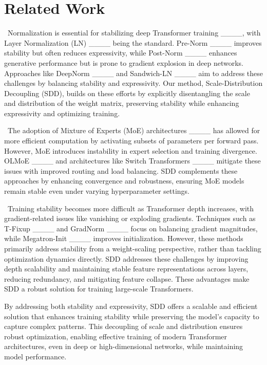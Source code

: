 \section{Related Work}
\label{sec:related work}
\textbf{}\
Normalization is essential for stabilizing deep Transformer training ____, with Layer Normalization (LN) ____ being the standard. Pre-Norm ____ improves stability but often reduces expressivity, while Post-Norm ____ enhances generative performance but is prone to gradient explosion in deep networks. Approaches like DeepNorm ____ and Sandwich-LN ____ aim to address these challenges by balancing stability and expressivity. Our method, Scale-Distribution Decoupling (SDD), builds on these efforts by explicitly disentangling the scale and distribution of the weight matrix, preserving stability while enhancing expressivity and optimizing training.

\textbf{}\
The adoption of Mixture of Experts (MoE) architectures ____ has allowed for more efficient computation by activating subsets of parameters per forward pass. However, MoE introduces instability in expert selection and training divergence. OLMoE ____ and architectures like Switch Transformers ____ mitigate these issues with improved routing and load balancing. SDD complements these approaches by enhancing convergence and robustness, ensuring MoE models remain stable even under varying hyperparameter settings.

\textbf{\noindent{Scaling and Stability in Large Language Models.}}\
Training stability becomes more difficult as Transformer depth increases, with gradient-related issues like vanishing or exploding gradients. Techniques such as T-Fixup ____ and GradNorm ____ focus on balancing gradient magnitudes, while Megatron-Init ____ improves initialization. However, these methods primarily address stability from a weight-scaling perspective, rather than tackling optimization dynamics directly. SDD addresses these challenges by improving depth scalability and maintaining stable feature representations across layers, reducing redundancy, and mitigating feature collapse. These advantages make SDD a robust solution for training large-scale Transformers.

By addressing both stability and expressivity, SDD offers a scalable and efficient solution that enhances training stability while preserving the model's capacity to capture complex patterns. This decoupling of scale and distribution ensures robust optimization, enabling effective training of modern Transformer architectures, even in deep or high-dimensional networks, while maintaining model performance.